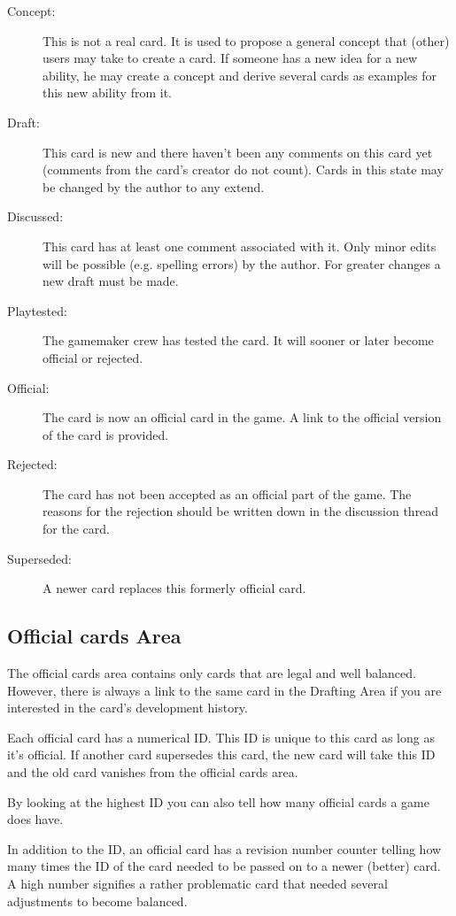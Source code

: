 \documentclass[a4paper, 11pt]{scrbook}
\begin{document}
\begin{description}
 \item[Concept:] This is not a real card. It is used to propose a general concept that (other) users may take to create a card. If someone has a new idea for a new ability, he may create a concept and derive several cards as examples for this new ability from it.
 \item[Draft:] This card is new and there haven't been any comments on this card yet (comments from the card's creator do not count). Cards in this state may be changed by the author to any extend.
 \item[Discussed:] This card has at least one comment associated with it. Only minor edits will be possible (e.g. spelling errors) by the author. For greater changes a new draft must be made. %
 \item[Playtested:] The gamemaker crew has tested the card. It will sooner or later become official or rejected.
 \item[Official:] The card is now an official card in the game. A link to the official version of the card is provided.
 \item[Rejected:] The card has not been accepted as an official part of the game. The reasons for the rejection should be written down in the discussion thread for the card.
 \item[Superseded:] A newer card replaces this formerly official card.
\end{description}

\subsection{Official cards Area}
The official cards area contains only cards that are legal and well balanced. However, there is always a link to the same card in the Drafting Area if you are interested in the card's development history.

Each official card has a numerical ID. This ID is unique to this card as long as it's official. If another card supersedes this card, the new card will take this ID and the old card vanishes from the official cards area.

By looking at the highest ID you can also tell how many official cards a game does have.

In addition to the ID, an official card has a revision number counter telling how many times the ID of the card needed to be passed on to a newer (better) card. A high number signifies a rather problematic card that needed several adjustments to become balanced.
\end{document}
